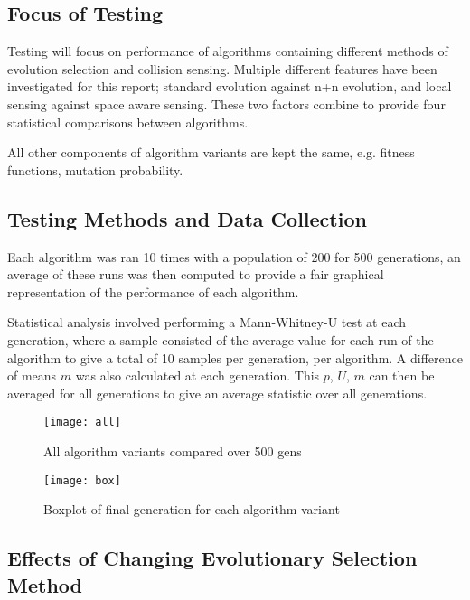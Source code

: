 \subsection{Focus of Testing}
Testing will focus on performance of algorithms containing different methods of evolution selection and collision sensing. Multiple different features have been investigated for this report; standard evolution against n+n evolution, and local sensing against space aware sensing. These two factors combine to provide four statistical comparisons between algorithms.

All other components of algorithm variants are kept the same, e.g. fitness functions, mutation probability.

\subsection{Testing Methods and Data Collection}
Each algorithm was ran 10 times with a population of 200 for 500 generations, an average of these runs was then computed to provide a fair graphical representation of the performance of each algorithm.

Statistical analysis involved performing a Mann-Whitney-U test at each generation, where a sample consisted of the average value for each run of the algorithm to give a total of 10 samples per generation, per algorithm. A difference of means $m$ was also calculated at each generation. This $p$, $U$, $m$ can then be averaged for all generations to give an average statistic over all generations.

\begin{figure}[h]
  \centering
  \begin{minipage}{.5\textwidth}
    \centering
    \captionsetup{width=.8\linewidth}
    \texttt{[image: all]}
    \caption{All algorithm variants compared over 500 gens}
    \label{all}
  \end{minipage}%
  \begin{minipage}{.5\textwidth}
    \centering
    \captionsetup{width=.8\linewidth}
    \texttt{[image: box]}
    \caption{Boxplot of final generation for each algorithm variant}
    \label{box}
  \end{minipage}
\end{figure}

\subsection{Effects of Changing Evolutionary Selection Method}

